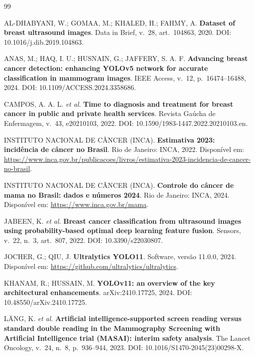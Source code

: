 \documentclass[11pt,a4paper]{article}
\begin{document}
\renewcommand{\refname}{Referências}
\begin{thebibliography}{99}
\setlength{\itemsep}{2pt}\small

AL-DHABYANI, W.; GOMAA, M.; KHALED, H.; FAHMY, A.
\textbf{Dataset of breast ultrasound images}.
Data in Brief, v.~28, art.~104863, 2020. DOI: 10.1016/j.dib.2019.104863.

ANAS, M.; HAQ, I. U.; HUSNAIN, G.; JAFFERY, S. A. F.
\textbf{Advancing breast cancer detection: enhancing YOLOv5 network for accurate
classification in mammogram images}.
IEEE Access, v.~12, p.~16474--16488, 2024. DOI: 10.1109/ACCESS.2024.3358686.

CAMPOS, A. A. L. \textit{et al.}
\textbf{Time to diagnosis and treatment for breast cancer in public and private
health services}.
Revista Gaúcha de Enfermagem, v.~43, e20210103, 2022.
DOI: 10.1590/1983-1447.2022.20210103.en.

INSTITUTO NACIONAL DE CÂNCER (INCA).
\textbf{Estimativa 2023: incidência de câncer no Brasil}.
Rio de Janeiro: INCA, 2022. Disponível em:
\url{https://www.inca.gov.br/publicacoes/livros/estimativa-2023-incidencia-de-cancer-no-brasil}.

INSTITUTO NACIONAL DE CÂNCER (INCA).
\textbf{Controle do câncer de mama no Brasil: dados e números 2024}.
Rio de Janeiro: INCA, 2024. Disponível em: \url{https://www.inca.gov.br/mama}.

JABEEN, K. \textit{et al.}
\textbf{Breast cancer classification from ultrasound images using
probability-based optimal deep learning feature fusion}.
Sensors, v.~22, n.~3, art.~807, 2022. DOI: 10.3390/s22030807.

JOCHER, G.; QIU, J.
\textbf{Ultralytics YOLO11}. Software, versão 11.0.0, 2024.
Disponível em: \url{https://github.com/ultralytics/ultralytics}.

KHANAM, R.; HUSSAIN, M.
\textbf{YOLOv11: an overview of the key architectural enhancements}.
arXiv:2410.17725, 2024. DOI: 10.48550/arXiv.2410.17725.

LÄNG, K. \textit{et al.}
\textbf{Artificial intelligence-supported screen reading versus standard double
reading in the Mammography Screening with Artificial Intelligence trial (MASAI):
interim safety analysis}.
The Lancet Oncology, v.~24, n.~8, p.~936--944, 2023.
DOI: 10.1016/S1470-2045(23)00298-X.


\end{thebibliography}
\end{document}

